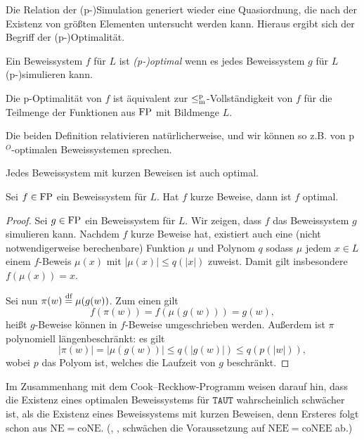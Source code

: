 
Die Relation der (p-)Simulation generiert wieder eine Quasiordnung, die nach der Existenz von größten  Elementen untersucht werden kann. 
Hieraus ergibt sich der Begriff der (p-)Optimalität.
\begin{definition}
    Ein Beweissystem $f$ für $L$ ist \emph{(p-)optimal} wenn es jedes Beweissystem $g$ für $L$ (p-)simulieren kann.

    Die p-Optimalität von $f$ ist äquivalent zur $\leq_\mathrm{m}^\mathrm{p}$-Vollständigkeit von $f$ für die Teilmenge der Funktionen aus $\mathrm{FP}$ mit Bildmenge $L$.
\end{definition}
Die beiden Definition relativieren natürlicherweise, und wir können so z.B. von p${}^O$-optimalen Beweissystemen sprechen.

Jedes Beweissystem mit kurzen Beweisen ist auch optimal.
\begin{observation}\label{obs:super-ps-sind-opt}
    Sei $f\in\mathrm{FP}$ ein Beweissystem für $L$. Hat $f$ kurze Beweise, dann ist $f$ optimal.
\end{observation}
\begin{proof}
    Sei $g\in\mathrm{FP}$ ein Beweissystem für $L$. Wir zeigen, dass $f$ das Beweissystem $g$ simulieren kann.
    Nachdem $f$ kurze Beweise hat, existiert auch eine (nicht notwendigerweise berechenbare) Funktion $\mu$ und Polynom $q$ sodass $\mu$ jedem $x\in L$ einem $f$-Beweis $\mu(x)$ mit $|\mu(x)|\leq q(|x|)$ zuweist. Damit gilt insbesondere $f(\mu(x)) = x$.

    Sei nun $\pi(w)\stackrel{\text{df}}{=}\mu(g(w))$. Zum einen gilt
    \[ f(\pi(w)) = f(\mu(g(w))) = g(w), \]
    heißt $g$-Beweise können in $f$-Beweise umgeschrieben werden.
    Außerdem ist $\pi$ polynomiell längenbeschränkt: es gilt
    \[ |\pi(w)|=|\mu(g(w))| \leq q(|g(w)|) \leq q(p(|w|)), \]
    wobei $p$ das Polyom ist, welches die Laufzeit von $g$ beschränkt.
\end{proof}

Im Zusammenhang mit dem Cook–Reckhow-Programm weisen \textcite{krajicek_propositional_1989} darauf hin, dass die Existenz eines optimalen Beweissystems für $\mathtt{TAUT}$ wahrscheinlich schwächer ist, als die Existenz eines Beweissystems mit kurzen Beweisen, denn Ersteres folgt schon aus $\mathrm{NE}=\mathrm{coNE}$. (\citeauthor{kobler_optimal_2003}, \citeyear{kobler_optimal_2003}, schwächen die Voraussetzung auf $\mathrm{NEE=coNEE}$ ab.)

